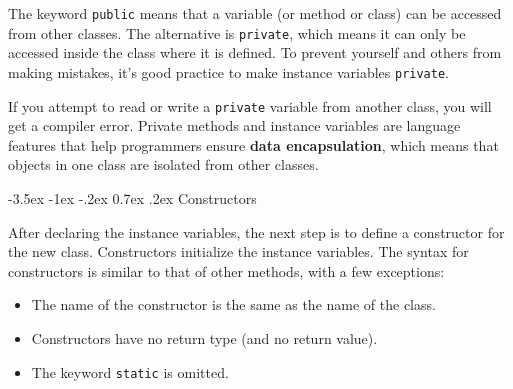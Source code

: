 \documentclass[12pt]{book}
\makeatletter
\renewcommand{\section}{\@startsection {section}{1}{\z@}%
    {-3.5ex \@plus -1ex \@minus -.2ex}%
    {0.7ex \@plus.2ex}%
    {\normalfont\Large\bfseries}}
\renewcommand\subsection{\@startsection{subsection}{2}{\z@}%
    {-3.25ex\@plus -1ex \@minus -.2ex}%
    {0.3ex \@plus .2ex}%
    {\normalfont\large\bfseries}}
\theoremstyle{exercise}
\newcommand{\java}[1]{\lstinline{#1}} %
\makeatother
\begin{document}

The keyword \java{public} means that a variable (or method or class) can be accessed from other classes.
The alternative is \java{private}, which means it can only be accessed inside the class where it is defined.
To prevent yourself and others from making mistakes, it's good practice to make instance variables \java{private}.


If you attempt to read or write a \java{private} variable from another class, you will get a compiler error.
Private methods and instance variables are language features that help programmers ensure {\bf data encapsulation}, which means that objects in one class are isolated from other classes.




\section{Constructors}


After declaring the instance variables, the next step is to define a constructor for the new class.
Constructors initialize the instance variables.
The syntax for constructors is similar to that of other methods, with a few exceptions:

\begin{itemize}
\item The name of the constructor is the same as the name of the class.
\item Constructors have no return type (and no return value).
\item The keyword \java{static} is omitted.
\end{itemize}
\end{document}
